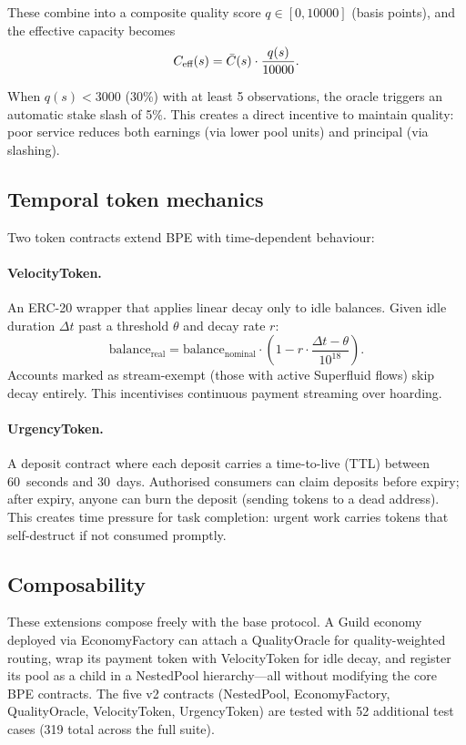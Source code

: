 These combine into a composite quality score $q \in [0, 10000]$ (basis points),
and the effective capacity becomes
\[
  C_{\text{eff}}(s) = \bar{C}(s) \cdot \frac{q(s)}{10000}.
\]

When $q(s) < 3000$ (30\%) with at least 5 observations, the oracle triggers an
automatic stake slash of 5\%. This creates a direct incentive to maintain quality:
poor service reduces both earnings (via lower pool units) and principal (via slashing).

\subsection{Temporal token mechanics}

Two token contracts extend BPE with time-dependent behaviour:

\paragraph{VelocityToken.}
An ERC-20 wrapper that applies linear decay only to idle balances.
Given idle duration $\Delta t$ past a threshold $\theta$ and decay rate $r$:
\[
  \text{balance}_{\text{real}} = \text{balance}_{\text{nominal}} \cdot \left(1 - r \cdot \frac{\Delta t - \theta}{10^{18}}\right).
\]
Accounts marked as stream-exempt (those with active Superfluid flows) skip decay
entirely. This incentivises continuous payment streaming over hoarding.

\paragraph{UrgencyToken.}
A deposit contract where each deposit carries a time-to-live (TTL) between
60~seconds and 30~days. Authorised consumers can claim deposits before expiry;
after expiry, anyone can burn the deposit (sending tokens to a dead address).
This creates time pressure for task completion: urgent work carries tokens that
self-destruct if not consumed promptly.

\subsection{Composability}

These extensions compose freely with the base protocol. A Guild economy
deployed via EconomyFactory can attach a QualityOracle for quality-weighted routing,
wrap its payment token with VelocityToken for idle decay, and register its pool as
a child in a NestedPool hierarchy---all without modifying the core BPE contracts.
The five v2 contracts (NestedPool, EconomyFactory, QualityOracle, VelocityToken,
UrgencyToken) are tested with 52 additional test cases (319 total across the full suite).
